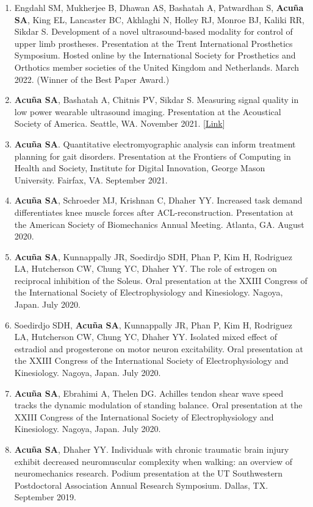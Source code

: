 \documentclass[letterpaper, 10pt]{article}
\begin{document}
\begin{enumerate}
    \item Engdahl SM, Mukherjee B, Dhawan AS, Bashatah A, Patwardhan S, \textbf{Acuña SA}, King EL, Lancaster BC, Akhlaghi N, Holley RJ, Monroe BJ, Kaliki RR, Sikdar S. Development of a novel ultrasound-based modality for control of upper limb prostheses. Presentation at the Trent International Prosthetics Symposium. Hosted online by the International Society for Prosthetics and Orthotics member societies of the United Kingdom and Netherlands. March 2022. (Winner of the Best Paper Award.)
    \item \textbf{Acuña SA}, Bashatah A, Chitnis PV, Sikdar S. Measuring signal quality in low power wearable ultrasound imaging. Presentation at the Acoustical Society of America. Seattle, WA. November 2021. [\href{https://asa.scitation.org/doi/10.1121/10.0007727}{Link}]
    \item \textbf{Acuña SA}. Quantitative electromyographic analysis can inform treatment planning for gait disorders. Presentation at the Frontiers of Computing in Health and Society, Institute for Digital Innovation, George Mason University. Fairfax, VA. September 2021.
    \item \textbf{Acuña SA}, Schroeder MJ, Krishnan C, Dhaher YY. Increased task demand differentiates knee muscle forces after ACL-reconstruction. Presentation at the American Society of Biomechanics Annual Meeting. Atlanta, GA. August 2020.
    \item \textbf{Acuña SA}, Kunnappally JR, Soedirdjo SDH, Phan P, Kim H, Rodriguez LA, Hutcherson CW, Chung YC, Dhaher YY. The role of estrogen on reciprocal inhibition of the Soleus. Oral presentation at the XXIII Congress of the International Society of Electrophysiology and Kinesiology. Nagoya, Japan. July 2020.
    \item Soedirdjo SDH, \textbf{Acuña SA}, Kunnappally JR, Phan P, Kim H, Rodriguez LA, Hutcherson CW, Chung YC, Dhaher YY. Isolated mixed effect of estradiol and progesterone on motor neuron excitability. Oral presentation at the XXIII Congress of the International Society of Electrophysiology and Kinesiology. Nagoya, Japan. July 2020.
    \item \textbf{Acuña SA}, Ebrahimi A, Thelen DG. Achilles tendon shear wave speed tracks the dynamic modulation of standing balance. Oral presentation at the XXIII Congress of the International Society of Electrophysiology and Kinesiology. Nagoya, Japan. July 2020.
    \item \textbf{Acuña SA}, Dhaher YY. Individuals with chronic traumatic brain injury exhibit decreased neuromuscular complexity when walking: an overview of neuromechanics research. Podium presentation at the UT Southwestern Postdoctoral Association Annual Research Symposium. Dallas, TX. September 2019.

\end{enumerate}
\end{document}
